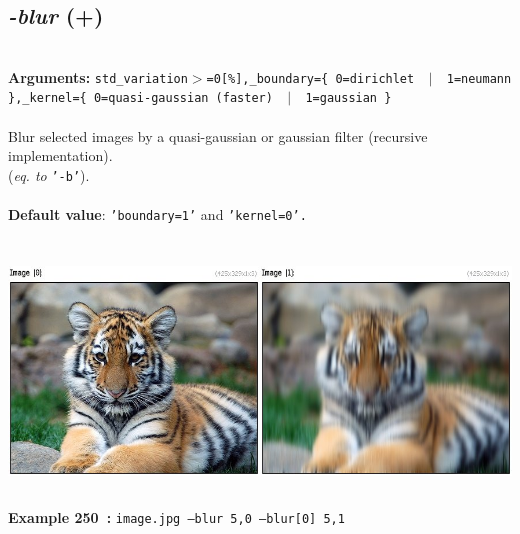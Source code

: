 \documentclass[a4paper,11pt,twoside]{book}
\begin{document}
\subsection{\emph{-blur} (+)}\vspace*{-0.5em}
~\\\textbf{Arguments: } 
{\small \texttt{std\_variation$>$=0[\%],\_boundary=\{ 0=dirichlet ~$|$~ 1=neumann \},\_kernel=\{ 0=quasi-gaussian (faster) ~$|$~ 1=gaussian \}}}\\~\\
Blur selected images by a quasi-gaussian or gaussian filter (recursive implementation).
~\\(\emph{eq. to} {\small \texttt{'-b'}}).
~\\~\\\textbf{Default value}: {\small \texttt{'boundary=1'} and \texttt{'kernel=0'.}}
\begin{center}\includegraphics[keepaspectratio=true,height=7cm,width=\textwidth]{img/gmic_def250.jpg}\\
{\footnotesize \textbf{Example 250~:} \texttt{image.jpg --blur 5,0 --blur[0] 5,1}}
\end{center}
\end{document}
